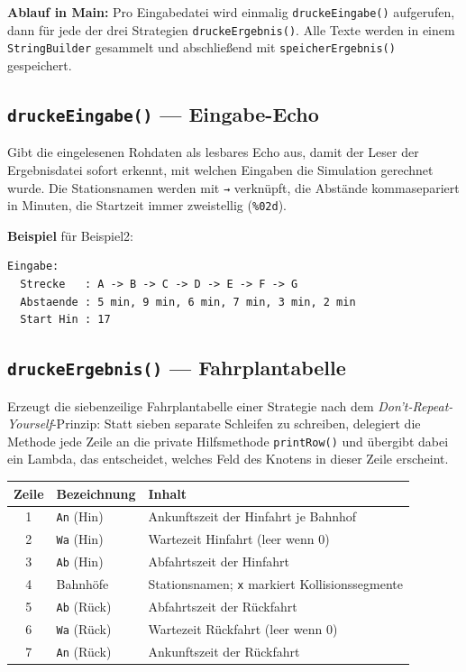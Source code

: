 \documentclass[12pt,a4paper]{article}
\begin{document}
\textbf{Ablauf in Main:}
Pro Eingabedatei wird einmalig \texttt{druckeEingabe()} aufgerufen,
dann für jede der drei Strategien \texttt{druckeErgebnis()}.
Alle Texte werden in einem \texttt{StringBuilder} gesammelt und
abschließend mit \texttt{speicherErgebnis()} gespeichert.

\subsection{\texttt{druckeEingabe()} — Eingabe-Echo}

Gibt die eingelesenen Rohdaten als lesbares Echo aus, damit der Leser
der Ergebnisdatei sofort erkennt, mit welchen Eingaben die Simulation
gerechnet wurde.
Die Stationsnamen werden mit \texttt{→} verknüpft, die Abstände
kommasepariert in Minuten, die Startzeit immer zweistellig (\texttt{\%02d}).

\textbf{Beispiel} für Beispiel2:
\begin{verbatim}
Eingabe:
  Strecke   : A -> B -> C -> D -> E -> F -> G
  Abstaende : 5 min, 9 min, 6 min, 7 min, 3 min, 2 min
  Start Hin : 17
\end{verbatim}

\subsection{\texttt{druckeErgebnis()} — Fahrplantabelle}

Erzeugt die siebenzeilige Fahrplantabelle einer Strategie nach dem
\emph{Don't-Repeat-Yourself}-Prinzip: Statt sieben separate Schleifen
zu schreiben, delegiert die Methode jede Zeile an die private Hilfsmethode
\texttt{printRow()} und übergibt dabei ein Lambda, das entscheidet,
welches Feld des Knotens in dieser Zeile erscheint.

\begin{center}
\begin{tabular}{cll}
\toprule
\textbf{Zeile} & \textbf{Bezeichnung} & \textbf{Inhalt} \\
\midrule
1 & \texttt{An} (Hin)  & Ankunftszeit der Hinfahrt je Bahnhof \\
2 & \texttt{Wa} (Hin)  & Wartezeit Hinfahrt (leer wenn 0) \\
3 & \texttt{Ab} (Hin)  & Abfahrtszeit der Hinfahrt \\
4 & Bahnhöfe           & Stationsnamen; \texttt{x} markiert Kollisionssegmente \\
5 & \texttt{Ab} (Rück) & Abfahrtszeit der Rückfahrt \\
6 & \texttt{Wa} (Rück) & Wartezeit Rückfahrt (leer wenn 0) \\
7 & \texttt{An} (Rück) & Ankunftszeit der Rückfahrt \\
\bottomrule
\end{tabular}
\end{center}
\end{document}
